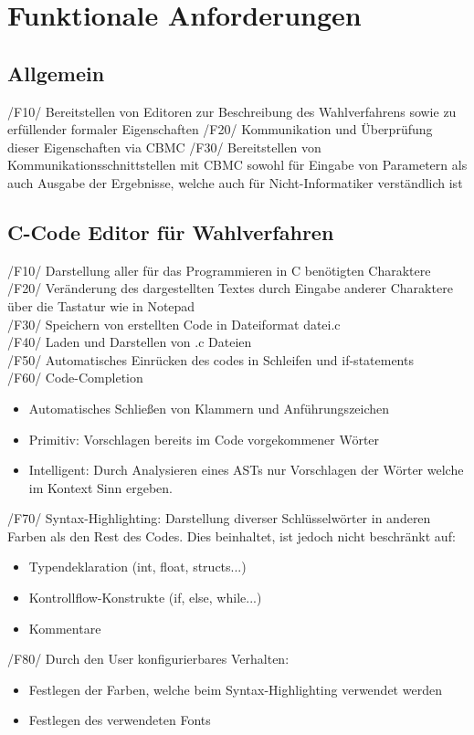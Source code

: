 \documentclass[a4paper]{scrreprt}
\begin{document}
\chapter{Funktionale Anforderungen}
\section{Allgemein}
/F10/ Bereitstellen von Editoren zur Beschreibung des Wahlverfahrens sowie zu erfüllender formaler Eigenschaften
/F20/ Kommunikation und Überprüfung dieser Eigenschaften via CBMC
/F30/ Bereitstellen von Kommunikationsschnittstellen mit CBMC sowohl für Eingabe von Parametern als auch Ausgabe der Ergebnisse, welche auch für Nicht-Informatiker verständlich ist


\section{C-Code Editor für Wahlverfahren}
/F10/ Darstellung aller für das Programmieren in C benötigten Charaktere \\
/F20/ Veränderung des dargestellten Textes durch Eingabe anderer Charaktere über die  Tastatur wie in Notepad \\
/F30/ Speichern von erstellten Code in Dateiformat datei.c \\
/F40/ Laden und Darstellen von .c Dateien  \\
/F50/ Automatisches Einrücken des codes in Schleifen und if-statements \\
/F60/ Code-Completion
\begin{itemize}
\item Automatisches Schließen von Klammern und Anführungszeichen
\item Primitiv: Vorschlagen bereits im Code vorgekommener Wörter
\item Intelligent: Durch Analysieren eines ASTs nur Vorschlagen der Wörter welche im Kontext Sinn ergeben.
\end{itemize}
/F70/ Syntax-Highlighting: Darstellung diverser Schlüsselwörter in anderen Farben als den Rest des Codes. Dies beinhaltet, ist jedoch nicht beschränkt auf: 
\begin{itemize}
\item Typendeklaration (int, float, structs...)
\item Kontrollflow-Konstrukte (if, else, while...)
\item Kommentare
\end{itemize}
/F80/ Durch den User konfigurierbares Verhalten:
\begin{itemize}
\item Festlegen der Farben, welche beim Syntax-Highlighting verwendet werden
\item Festlegen des verwendeten Fonts
\end{itemize}
\end{document}
